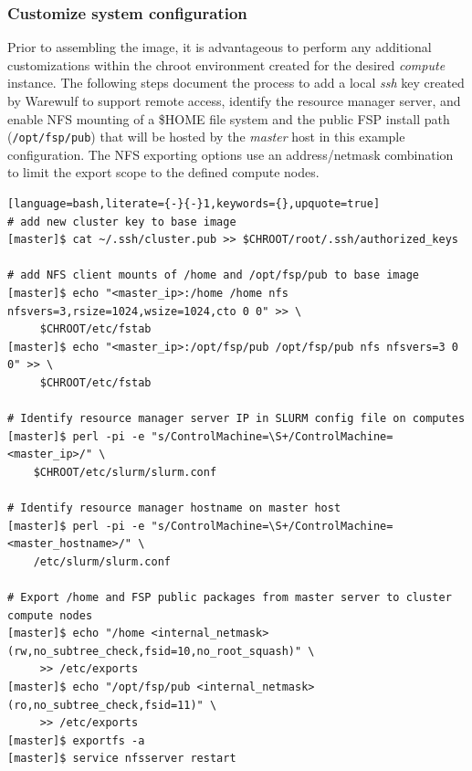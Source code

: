 \documentclass[letterpaper]{article}
\begin{document}

\subsubsection{Customize system configuration} \label{sec:master_customization}

Prior to assembling the image, it is advantageous to perform any additional
customizations within the chroot environment created for the desired {\em
  compute} instance. The following steps document the process to add a local
{\em ssh} key created by Warewulf to support remote access, identify the
resource manager server, and enable NFS mounting of a \$HOME file system and
the public FSP install path (\texttt{/opt/fsp/pub}) that will be hosted by the
{\em master} host in this example configuration.  The NFS exporting options use
an address/netmask combination to limit the export scope to the defined compute nodes.


\begin{lstlisting}[language=bash,literate={-}{-}1,keywords={},upquote=true]
# add new cluster key to base image
[master]$ cat ~/.ssh/cluster.pub >> $CHROOT/root/.ssh/authorized_keys

# add NFS client mounts of /home and /opt/fsp/pub to base image
[master]$ echo "<master_ip>:/home /home nfs nfsvers=3,rsize=1024,wsize=1024,cto 0 0" >> \
     $CHROOT/etc/fstab
[master]$ echo "<master_ip>:/opt/fsp/pub /opt/fsp/pub nfs nfsvers=3 0 0" >> \
     $CHROOT/etc/fstab

# Identify resource manager server IP in SLURM config file on computes
[master]$ perl -pi -e "s/ControlMachine=\S+/ControlMachine=<master_ip>/" \
    $CHROOT/etc/slurm/slurm.conf

# Identify resource manager hostname on master host
[master]$ perl -pi -e "s/ControlMachine=\S+/ControlMachine=<master_hostname>/" \
    /etc/slurm/slurm.conf

# Export /home and FSP public packages from master server to cluster compute nodes
[master]$ echo "/home <internal_netmask>(rw,no_subtree_check,fsid=10,no_root_squash)" \
     >> /etc/exports
[master]$ echo "/opt/fsp/pub <internal_netmask>(ro,no_subtree_check,fsid=11)" \
     >> /etc/exports
[master]$ exportfs -a
[master]$ service nfsserver restart
\end{lstlisting}
\end{document}
